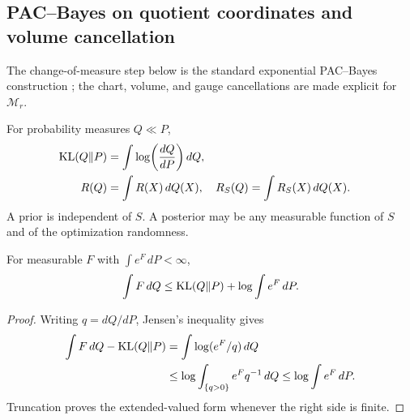 \subsection{PAC--Bayes on quotient coordinates and volume cancellation}
\label{app:rigid-pacbayes}
The change-of-measure step below is the standard exponential
PAC--Bayes construction \cite{seldin2012pac}; the chart, volume,
and gauge cancellations are made explicit for $\mathcal M_r$.

\begin{definition}
For probability measures $Q\ll P$,
\begin{align}
{\rm KL}(Q\|P)&=\int\log\!\left(\frac{dQ}{dP}\right)dQ,\\
R(Q)&=\int R(X)\,dQ(X),&
R_S(Q)&=\int R_S(X)\,dQ(X).
\end{align}
A prior is independent of $S$. A posterior may be any measurable
function of $S$ and of the optimization randomness.
\end{definition}

\begin{lemma}
For measurable $F$ with $\int e^F\,dP<\infty$,
\begin{equation}
\int F\,dQ\leq {\rm KL}(Q\|P)+\log\int e^F\,dP .
\label{eq:rigid-dv}
\end{equation}
\end{lemma}
\begin{proof}
Writing $q=dQ/dP$, Jensen's inequality gives
\begin{align}
\int F\,dQ-{\rm KL}(Q\|P)
&=\int\log(e^F/q)\,dQ\\
&\leq\log\int_{\{q>0\}}e^Fq^{-1}\,dQ
\leq\log\int e^F\,dP .
\end{align}
Truncation proves the extended-valued form whenever the right side
is finite.
\end{proof}

